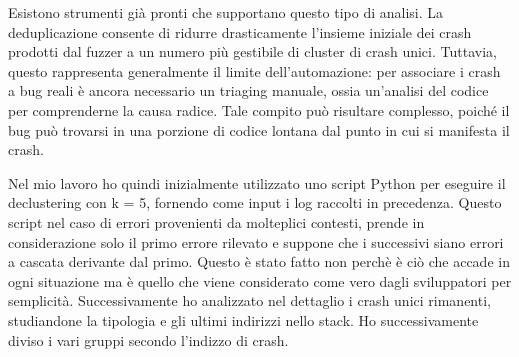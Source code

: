 Esistono strumenti già pronti che supportano questo tipo di analisi. La deduplicazione consente di ridurre drasticamente l’insieme iniziale dei crash prodotti dal fuzzer a un numero più gestibile di cluster di crash unici. Tuttavia, questo rappresenta generalmente il limite dell’automazione: per associare i crash a bug reali è ancora necessario un triaging manuale, ossia un’analisi del codice per comprenderne la causa radice. Tale compito può risultare complesso, poiché il bug può trovarsi in una porzione di codice lontana dal punto in cui si manifesta il crash.

Nel mio lavoro ho quindi inizialmente utilizzato uno script Python per eseguire il declustering con k = 5, fornendo come input i log raccolti in precedenza. Questo script nel caso di errori provenienti da molteplici contesti, prende in considerazione solo il primo errore rilevato e suppone che i successivi siano errori a cascata derivante dal primo. Questo è stato fatto non perchè è ciò che accade in ogni situazione ma è quello che viene considerato come vero dagli sviluppatori per semplicità.  Successivamente ho analizzato nel dettaglio i crash unici rimanenti, studiandone la tipologia e gli ultimi indirizzi nello stack. Ho successivamente diviso i vari gruppi secondo l’indizzo di crash. 

